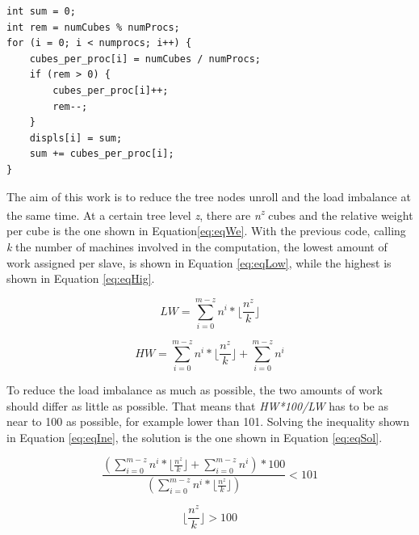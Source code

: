 \documentclass[a4paper]{article}
\begin{document}
\begin{lstlisting}
int sum = 0;
int rem = numCubes % numProcs; 
for (i = 0; i < numprocs; i++) {
    cubes_per_proc[i] = numCubes / numProcs;
    if (rem > 0) {
        cubes_per_proc[i]++;
        rem--;
    }
    displs[i] = sum;
    sum += cubes_per_proc[i];
}
\end{lstlisting}
\FloatBarrier

The aim of this work is to reduce the tree nodes unroll and the load imbalance at the same time.
At a certain tree level \textit{z}, there are \textit{n\textsuperscript{z}} cubes and the relative weight per cube is the one shown in Equation\ref{eq:eqWe}. With the previous code, calling \textit{k} the number of machines involved in the computation, the lowest amount of work assigned per slave, is shown in Equation \ref{eq:eqLow}, while the highest is shown in Equation \ref{eq:eqHig}. 

\begin{equation} 
\label{eq:eqLow}
LW=\sum_{i=0}^{m-z}{n^i}*\lfloor\frac{n^z}{k}\rfloor
\end{equation}
\FloatBarrier

\begin{equation} 
\label{eq:eqHig}
HW=\sum_{i=0}^{m-z}{n^i}*\lfloor\frac{n^z}{k}\rfloor +  \sum_{i=0}^{m-z}{n^i}
\end{equation}
\FloatBarrier

To reduce the load imbalance as much as possible, the two amounts of work should differ as little as possible. That means that \textit{HW*100/LW} has to be as near to 100 as possible, for example lower than 101. Solving the inequality shown in Equation \ref{eq:eqIne}, the solution is the one shown in Equation \ref{eq:eqSol}.

\begin{equation} 
\label{eq:eqIne}
\frac{(\sum_{i=0}^{m-z}{n^i}*\lfloor\frac{n^z}{k}\rfloor +  \sum_{i=0}^{m-z}{n^i})*100}{(\sum_{i=0}^{m-z}{n^i}*\lfloor\frac{n^z}{k}\rfloor)} < 101
\end{equation}
\FloatBarrier

\begin{equation} 
\label{eq:eqSol}
\lfloor\frac{n^z}{k}\rfloor > 100
\end{equation}
\FloatBarrier
\end{document}

